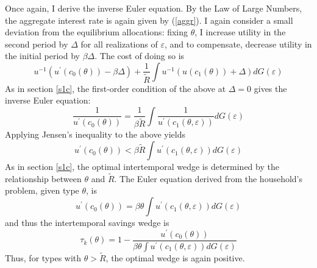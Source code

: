 \documentclass[11pt]{article}
\newcommand{\p}{\prime}
\newcommand{\inv}[1]{#1^{-1}}
\begin{document}
Once again, I derive the inverse Euler equation. By the Law of Large Numbers, the aggregate interest rate is again given by (\ref{aggr}). I again consider a small deviation from the equilibrium allocations: fixing \( \theta \), I increase utility in the second period by \( \Delta \) for all realizations of \( \varepsilon \), and to compensate, decrease utility in the initial period by \( \beta\Delta \). The cost of doing so is 
\[\inv{u}\left( u^\p (c_0(\theta)) - \beta\Delta \right) + \frac{1}{\tilde{R}} \int \inv{u}\left( u(c_1(\theta)) + \Delta \right)dG(\varepsilon)\]
As in section \ref{s1c}, the first-order condition of the above at \( \Delta = 0 \) gives the inverse Euler equation:
\begin{equation}
    \frac{1}{u^\p(c_0(\theta))} = \frac{1}{\beta\tilde{R}} \int \frac{1}{u^\p(c_1(\theta, \varepsilon))}dG(\varepsilon) \label{inv_eul_s}
\end{equation}
Applying Jensen's inequality to the above yields 
\[u^\p(c_0(\theta)) < \beta\tilde{R} \int u^\p(c_1(\theta, \varepsilon)) dG(\varepsilon) \]
As in section \ref{s1c}, the optimal intertemporal wedge is determined by the relationship between \( \theta \) and \( \tilde{R} \). The Euler equation derived from the household's problem, given type \( \theta \), is 
\[u^\p(c_0(\theta)) = \beta\theta \int u^\p(c_1(\theta, \varepsilon))dG(\varepsilon)\]
and thus the intertemporal savings wedge is 
\[\tau_k(\theta) = 1 - \frac{u^\p(c_0(\theta))}{\beta\theta \int u^\p(c_1(\theta, \varepsilon))dG(\varepsilon)}\]
Thus, for types with \( \theta > \tilde{R} \), the optimal wedge is again positive. 



\end{document}
